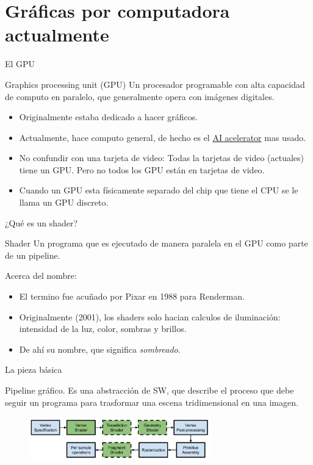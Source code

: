 \section{Gráficas por computadora actualmente}

\begin{frame}{El GPU}
\begin{block}{Graphics processing unit (GPU)}
    Un procesador programable con alta capacidad de computo en paralelo, que generalmente opera con imágenes digitales.
\end{block}
    \begin{itemize}
        \item Originalmente estaba dedicado a hacer gráficos.
        \item Actualmente, hace computo general, de hecho es el \href{https://en.wikipedia.org/wiki/AI_accelerator}{AI acelerator} mas usado.
        \item No confundir con una tarjeta de video: Todas la tarjetas de video (actuales) tiene un GPU. Pero no todos los GPU están en tarjetas de video.
        \item Cuando un GPU esta físicamente separado del chip que tiene el CPU se le llama un GPU discreto.
     \end{itemize}
\end{frame}

\begin{frame}{¿Qué es un shader?}
\begin{block}{Shader}
    Un programa que es ejecutado de manera paralela en el GPU como parte de un pipeline.
\end{block}
Acerca del nombre:
    \begin{itemize}
        \item El termino fue acuñado por Pixar en 1988 para Renderman.
        \item Originalmente (2001), los shaders solo hacian calculos de iluminación: intensidad de la luz, color, sombras y brillos.
        \item De ahí su nombre, que significa \emph{sombreado}.
     \end{itemize}

\end{frame}

\begin{frame}{La pieza básica}
\begin{block}{Pipeline gráfico.}
    Es una abstracción de SW, que describe el proceso que debe seguir un programa para trasformar una escena tridimensional en una imagen.
\end{block}
\begin{figure}[htb]
  \centering
  \includegraphics[width=0.7\textwidth]{img/RenderPipeline}
\end{figure} 
\end{frame}

